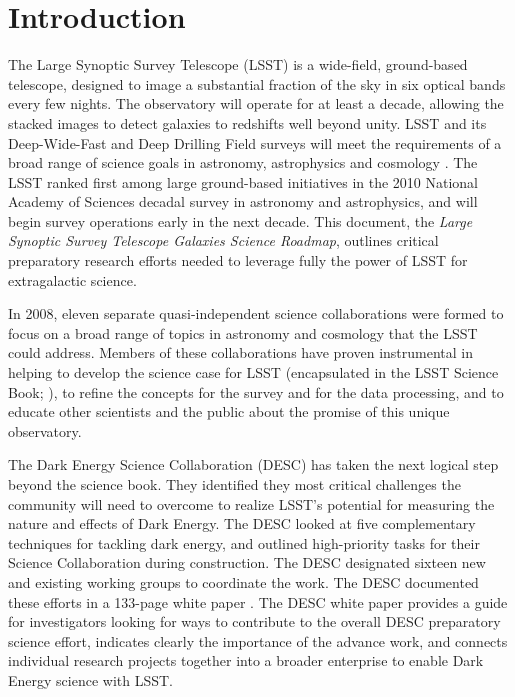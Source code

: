 
\chapter[Introduction]{Introduction}
\label{ch:intro}

{\justify
The Large Synoptic Survey Telescope (LSST) is a wide-field, ground-based
telescope, designed to image a substantial fraction of the sky in six optical
bands every few nights. 
The observatory will operate for at least a decade, allowing the
stacked images to detect galaxies to redshifts well beyond unity. LSST and
its Deep-Wide-Fast and Deep Drilling Field surveys will meet 
the requirements of a broad range of science goals in astronomy, astrophysics and cosmology
\citep{ivezic2008a}. 
The LSST ranked first among large ground-based initiatives in the
2010 National Academy of Sciences decadal survey in astronomy and astrophysics,
and will begin survey operations early in the next decade.
This document, the {\it Large Synoptic Survey Telescope Galaxies Science Roadmap}, outlines critical preparatory research efforts needed 
to leverage fully the power of LSST for extragalactic science. 

In 2008, eleven separate quasi-independent science collaborations were formed to
focus on a broad range of topics in astronomy and cosmology that the LSST could
address. Members of these collaborations have proven instrumental in helping to
develop the science case for LSST (encapsulated in the LSST Science Book;
\citet{LSSTSciBook}), to
refine the concepts for the survey and for the data processing, and to educate
other scientists and the public about the promise of this unique observatory.

The Dark Energy Science Collaboration (DESC) has taken the
next logical step beyond the science book. They identified they most critical
challenges the community will need to overcome
to realize LSST’s potential for
measuring the nature and effects of Dark Energy. The
DESC looked at five complementary
techniques for tackling dark energy, and outlined high-priority tasks for their
Science Collaboration during construction. The DESC designated sixteen 
new and existing working
groups to coordinate the work. The DESC documented these efforts
in a 133-page white paper \citep{LSSTDESC}. The DESC white
paper provides a guide for investigators looking for ways to contribute to the
overall DESC preparatory science effort, 
indicates clearly the importance of the advance work, and 
connects individual research projects together into a broader 
enterprise to enable Dark Energy science with LSST.

}

